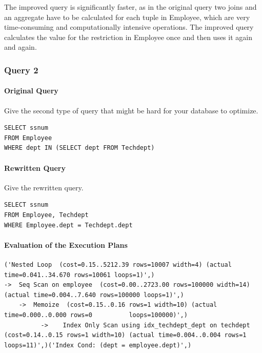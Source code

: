 \documentclass[11pt]{scrartcl}
\begin{document}
The improved query is significantly faster, as in the original query two joins and an aggregate have to be calculated for each tuple in Employee, which are very time-consuming and computationally intensive operations. The improved query calculates the value for the restriction in Employee once and then uses it again and again.

\subsubsection*{Query 2}

\paragraph{Original Query}

Give the second type of query that might be hard for your database to optimize.

\begin{lstlisting}[style=dbtsql]
SELECT ssnum
FROM Employee
WHERE dept IN (SELECT dept FROM Techdept)
\end{lstlisting}

\paragraph{Rewritten Query}

Give the rewritten query.

\begin{lstlisting}[style=dbtsql]
SELECT ssnum
FROM Employee, Techdept
WHERE Employee.dept = Techdept.dept
\end{lstlisting}

\paragraph{Evaluation of the Execution Plans}

{\small
\parskip0pt\begin{verbatim}
('Nested Loop  (cost=0.15..5212.39 rows=10007 width=4) (actual time=0.041..34.670 rows=10061 loops=1)',)
->  Seq Scan on employee  (cost=0.00..2723.00 rows=100000 width=14) (actual time=0.004..7.640 rows=100000 loops=1)',)
	->  Memoize  (cost=0.15..0.16 rows=1 width=10) (actual time=0.000..0.000 rows=0 	     loops=100000)',)
		  ->  	Index Only Scan using idx_techdept_dept on techdept  					(cost=0.14..0.15 rows=1 width=10) (actual time=0.004..0.004 rows=1 			loops=11)',)('Index Cond: (dept = employee.dept)',)
\end{verbatim}}
\end{document}
